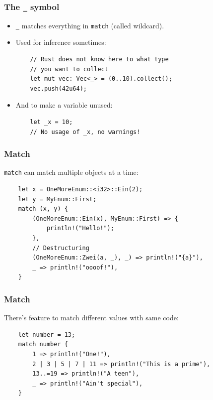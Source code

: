 \documentclass[aspectratio=1610,t]{beamer}
\begin{document}

\begin{frame}[fragile]
\frametitle{The \texttt{\_} symbol}
\begin{itemize}
    \item \texttt{\_} matches everything in \texttt{match} (called wildcard).
    \item Used for inference sometimes:
    \begin{verbatim}
    // Rust does not know here to what type
    // you want to collect
    let mut vec: Vec<_> = (0..10).collect();
    vec.push(42u64);
    \end{verbatim}
    \item And to make a variable unused:
    \begin{verbatim}
    let _x = 10;
    // No usage of _x, no warnings!
    \end{verbatim}
\end{itemize}
\end{frame}


\begin{frame}[fragile]
\frametitle{Match}
\texttt{match} can match multiple objects at a time:

\begin{verbatim}
    let x = OneMoreEnum::<i32>::Ein(2);
    let y = MyEnum::First;
    match (x, y) {
        (OneMoreEnum::Ein(x), MyEnum::First) => {
            println!("Hello!");
        },
        // Destructuring
        (OneMoreEnum::Zwei(a, _), _) => println!("{a}"),
        _ => println!("oooof!"),
    }
\end{verbatim}
\end{frame}


\begin{frame}[fragile]
\frametitle{Match}
There's feature to match different values with same code:

\begin{verbatim}
    let number = 13;
    match number {
        1 => println!("One!"),
        2 | 3 | 5 | 7 | 11 => println!("This is a prime"),
        13..=19 => println!("A teen"),
        _ => println!("Ain't special"),
    }
\end{verbatim}
\end{frame}
\end{document}
